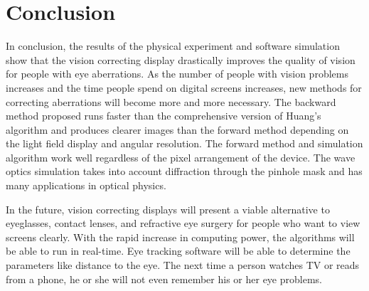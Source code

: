 \chapter{Conclusion}

In conclusion, the results of the physical experiment and software simulation show that the vision correcting display drastically improves the quality of vision for people with eye aberrations. As the number of people with vision problems increases and the time people spend on digital screens increases, new methods for correcting aberrations will become more and more necessary. The backward method proposed runs faster than the comprehensive version of Huang's algorithm and produces clearer images than the forward method depending on the light field display and angular resolution. The forward method and simulation algorithm work well regardless of the pixel arrangement of the device. The wave optics simulation takes into account diffraction through the pinhole mask and has many applications in optical physics. 

In the future, vision correcting displays will present a viable alternative to eyeglasses, contact lenses, and refractive eye surgery for people who want to view screens clearly. With the rapid increase in computing power, the algorithms will be able to run in real-time. Eye tracking software will be able to determine the parameters like distance to the eye. The next time a person watches TV or reads from a phone, he or she will not even remember his or her eye problems.


